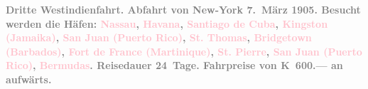 \documentclass[twoside=false,titlepage=false,open=any, parskip=never, fontsize=12pt, headings=small, chapterprefix=false, appendixprefix=false]{scrbook}
\begin{document}
           \pstart
           \textcolor{gray}{\textbf{\textbf{Dritte Westindienfahrt.} Abfahrt von New-York { }\textbf{7. März 1905}. Besucht werden die Häfen: \textcolor{pink}{Nassau}{}\ledrightnote{\textcolor{pink}{Nassau}}, \textcolor{pink}{Havana}{}\ledrightnote{\textcolor{pink}{Havana}}, \textcolor{pink}{Santiago
                     de Cuba}{}\ledrightnote{\textcolor{pink}{Santiago de Cuba}}, \textcolor{pink}{Kingston (Jamaika)}{}\ledrightnote{\textcolor{pink}{Kingston}}, \textcolor{pink}{San Juan (Puerto Rico)}{}\ledrightnote{\textcolor{pink}{San Juan}}, \textcolor{pink}{St. Thomas}{}\ledrightnote{\textcolor{pink}{Saint Thomas}}, \textcolor{pink}{Bridgetown
                     (Barbados)}{}\ledrightnote{\textcolor{pink}{Bridgetown}}, \textcolor{pink}{Fort de France
                  (Martinique)}{}\ledrightnote{\textcolor{pink}{Fort-de-France}}, \textcolor{pink}{St. Pierre}{}\ledrightnote{\textcolor{pink}{Saint-Pierre}}, \textcolor{pink}{San Juan (Puerto Rico)}{}\ledrightnote{\textcolor{pink}{San Juan}}, \textcolor{pink}{Bermudas}{}\ledrightnote{\textcolor{pink}{Bermuda}}. Reisedauer 24 Tage. Fahrpreise von \textbf{K 600.—}
                  an aufwärts.}}\pend
           \pstart
\end{document}
